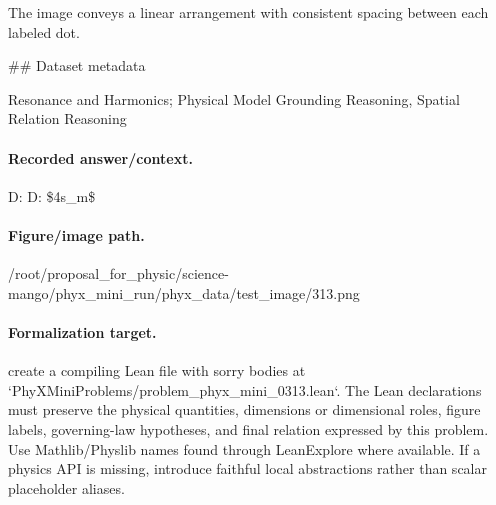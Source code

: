 The image conveys a linear arrangement with consistent spacing between each labeled dot.

\#\# Dataset metadata

Resonance and Harmonics; Physical Model Grounding Reasoning, Spatial Relation Reasoning

\paragraph{Recorded answer/context.}
D: D: \$4s\_m\$

\paragraph{Figure/image path.}
/root/proposal\_for\_physic/science-mango/phyx\_mini\_run/phyx\_data/test\_image/313.png

\paragraph{Formalization target.}
create a compiling Lean file with sorry bodies at `PhyXMiniProblems/problem\_phyx\_mini\_0313.lean`. The Lean declarations must preserve the physical quantities, dimensions or dimensional roles, figure labels, governing-law hypotheses, and final relation expressed by this problem.
Use Mathlib/Physlib names found through LeanExplore where available. If a physics API is missing, introduce faithful local abstractions rather than scalar placeholder aliases.


